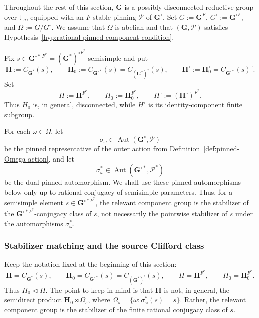 \documentclass{amsart}
\theoremstyle{plain}
\numberwithin{equation}{section}
\theoremstyle{definition}
\newcommand{\cP}{\mathcal{P}}
\newcommand{\Aut}{\operatorname{Aut}}
\newcommand{\bG}{\mathbf{G}}
\newcommand{\bH}{\mathbf{H}}
\newcommand{\F}{\mathbb{F}}
\begin{document}
Throughout the rest of this section, \(\bG\) is a possibly disconnected reductive
group over \(\F_q\), equipped with an \(F\)-stable pinning \(\cP\) of
\(\bG^\circ\).  Set \(G:=\bG^F\), \(G^\circ:=\bG^{\circ F}\), and
\(\Omega:=G/G^\circ\).  We assume that \(\Omega\) is abelian and that
\((\bG,\cP)\) satisfies Hypothesis~\ref{hyp:rational-pinned-component-condition}.

Fix \(s\in \bG^{\circ*\,F^*}=(\bG^*)^{\circ F^*}\) semisimple and put
\[
\bH:=C_{\bG^*}(s),\qquad
\bH_0:=C_{\bG^{\circ*}}(s)=C_{(\bG^*)^\circ}(s),\qquad
\bH^\circ:=\bH_0^\circ=C_{\bG^{\circ*}}(s)^\circ.
\]
Set
\[
H:=\bH^{F^*},\qquad
H_0:=\bH_0^{F^*},\qquad
H^\circ:=(\bH^\circ)^{F^*}.
\]
Thus \(H_0\) is, in general, disconnected, while \(H^\circ\) is its identity-component finite subgroup.

For each \(\omega\in\Omega\), let
\[
\sigma_\omega\in \Aut(\bG^\circ,\cP)
\]
be the pinned representative of the outer action from Definition~\ref{def:pinned-Omega-action},
and let
\[
\sigma_\omega^*\in \Aut(\bG^{\circ*},\cP^*)
\]
be the dual pinned automorphism. We shall use these pinned automorphisms below only up to rational conjugacy of
semisimple parameters.  Thus, for a semisimple element
\(s\in \bG^{\circ *F^*}\), the relevant component group is the stabilizer of
the \(\bG^{\circ *F^*}\)-conjugacy class of \(s\), not necessarily the
pointwise stabilizer of \(s\) under the automorphisms \(\sigma_\omega^*\).


\subsubsection{Stabilizer matching and the source Clifford class}
\label{subsubsec:stabilizer-matching-source-clifford}

Keep the notation fixed at the beginning of this section:
\[
\bH=C_{\bG^*}(s),\qquad
\bH_0=C_{\bG^{\circ *}}(s)=C_{(\bG^*)^\circ}(s),
\qquad
H=\bH^{F^*},\qquad H_0=\bH_0^{F^*}.
\]
Thus \(H_0\lhd H\).  The point to keep in mind is that
\(\bH\) is not, in general, the semidirect product
\(\bH_0\rtimes\Omega_s\), where
\(\Omega_s=\{\omega:\sigma_\omega^*(s)=s\}\).  Rather, the relevant
component group is the stabilizer of the finite rational conjugacy class of
\(s\).
\end{document}
